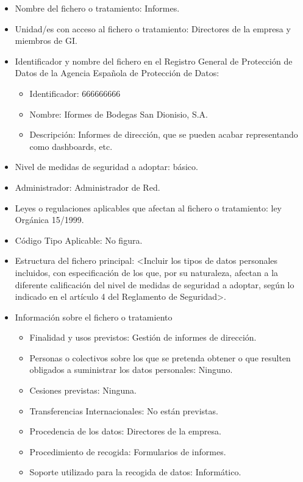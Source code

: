 \documentclass[a4paper,11pt,bibtotoc,noliststotoc]{scrbook}
\newcommand{\laorganizacion}{Bodegas San Dionisio, S.A.}
\begin{document}
\begin{itemize}
\item Nombre del fichero o tratamiento: Informes.

\item Unidad/es con acceso al fichero o tratamiento: Directores de la empresa y miembros de GI.

\item Identificador y nombre del fichero en el Registro General de Protección de Datos de la Agencia Española de Protección de Datos:
	\begin{itemize}
	\item Identificador: 666666666
	\item Nombre: Iformes de \laorganizacion
	\item Descripción: Informes de dirección, que se pueden acabar representando como dashboards, etc.
	\end{itemize}

\item Nivel de medidas de seguridad a adoptar: básico.

\item Administrador: Administrador de Red.

\item Leyes o regulaciones aplicables que afectan al fichero o tratamiento: ley Orgánica 15/1999.

\item Código Tipo Aplicable: No figura.

\item Estructura del fichero principal: <Incluir los tipos de datos personales incluidos, con especificación de los que, por su naturaleza, afectan a la diferente calificación del nivel de medidas de seguridad a adoptar, según lo indicado en el artículo 4 del Reglamento de Seguridad>.

\item Información sobre el fichero o tratamiento
	\begin{itemize}
	\item Finalidad y usos previstos: Gestión de informes de dirección.
	\item Personas o colectivos sobre los que se pretenda obtener o que resulten obligados a suministrar los datos personales: Ninguno.
	\item Cesiones previstas: Ninguna.
	\item Transferencias Internacionales: No están previstas.
	\item Procedencia de los datos: Directores de la empresa.
	\item Procedimiento de recogida: Formularios de informes.
	\item Soporte utilizado para la recogida de datos: Informático.
	\end{itemize}


\end{itemize}
\end{document}
